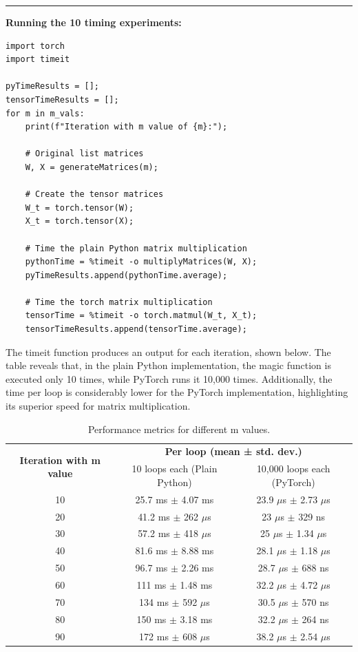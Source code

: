 \documentclass[12pt]{article}
\begin{document}
\noindent\rule{\textwidth}{0.4pt}
\noindent\textbf{Running the 10 timing experiments:}
\begin{lstlisting}
import torch
import timeit

pyTimeResults = [];
tensorTimeResults = [];
for m in m_vals:
    print(f"Iteration with m value of {m}:");

    # Original list matrices
    W, X = generateMatrices(m);

    # Create the tensor matrices
    W_t = torch.tensor(W);
    X_t = torch.tensor(X);

    # Time the plain Python matrix multiplication
    pythonTime = %timeit -o multiplyMatrices(W, X);
    pyTimeResults.append(pythonTime.average);

    # Time the torch matrix multiplication
    tensorTime = %timeit -o torch.matmul(W_t, X_t);
    tensorTimeResults.append(tensorTime.average);
\end{lstlisting}

\newpage

\noindent The timeit function produces an output for each iteration, shown below.
The table reveals that, in the plain Python implementation, the magic function is executed only 10 times, while PyTorch runs it 10,000 times.
Additionally, the time per loop is considerably lower for the PyTorch implementation, highlighting its superior speed for matrix multiplication.

\begin{table}[ht]
    \centering
    \begin{tabular}{|c|c|c|}
        \hline
        \multirow{2}{*}{\textbf{Iteration with m value}} & \multicolumn{2}{c|}{\textbf{Per loop (mean ± std. dev.)}} \\
        \cline{2-3}
            & 10 loops each (Plain Python) & 10,000 loops each (PyTorch) \\
        \hline
        10 & 25.7 ms $\pm$ 4.07 ms & 23.9 $\mu$s $\pm$ 2.73 $\mu$s \\
        \hline
        20 & 41.2 ms $\pm$ 262 $\mu$s & 23 $\mu$s $\pm$ 329 ns \\
        \hline
        30 & 57.2 ms $\pm$ 418 $\mu$s & 25 $\mu$s $\pm$ 1.34 $\mu$s \\
        \hline
        40 & 81.6 ms $\pm$ 8.88 ms & 28.1 $\mu$s $\pm$ 1.18 $\mu$s \\
        \hline
        50 & 96.7 ms $\pm$ 2.26 ms & 28.7 $\mu$s $\pm$ 688 ns \\
        \hline
        60 & 111 ms $\pm$ 1.48 ms & 32.2 $\mu$s $\pm$ 4.72 $\mu$s \\
        \hline
        70 & 134 ms $\pm$ 592 $\mu$s & 30.5 $\mu$s $\pm$ 570 ns \\
        \hline
        80 & 150 ms $\pm$ 3.18 ms & 32.2 $\mu$s $\pm$ 264 ns \\
        \hline
        90 & 172 ms $\pm$ 608 $\mu$s & 38.2 $\mu$s $\pm$ 2.54 $\mu$s \\
        \hline
    \end{tabular}
    \caption{Performance metrics for different m values.}
\end{table}
\end{document}
